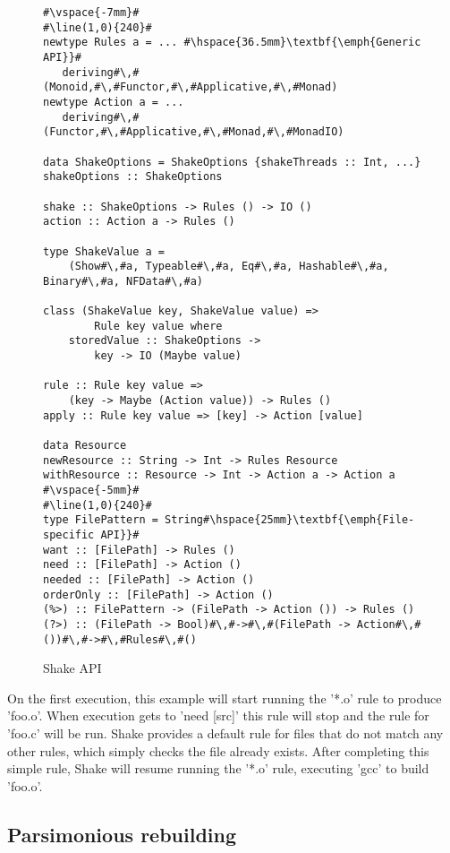 \begin{figure}
\begin{lstlisting}
#\vspace{-7mm}#
#\line(1,0){240}#
newtype Rules a = ... #\hspace{36.5mm}\textbf{\emph{Generic API}}#
   deriving#\,#(Monoid,#\,#Functor,#\,#Applicative,#\,#Monad)
newtype Action a = ...
   deriving#\,#(Functor,#\,#Applicative,#\,#Monad,#\,#MonadIO)

data ShakeOptions = ShakeOptions {shakeThreads :: Int, ...}
shakeOptions :: ShakeOptions

shake :: ShakeOptions -> Rules () -> IO ()
action :: Action a -> Rules ()

type ShakeValue a =
    (Show#\,#a, Typeable#\,#a, Eq#\,#a, Hashable#\,#a, Binary#\,#a, NFData#\,#a)

class (ShakeValue key, ShakeValue value) =>
        Rule key value where
    storedValue :: ShakeOptions ->
        key -> IO (Maybe value)

rule :: Rule key value =>
    (key -> Maybe (Action value)) -> Rules ()
apply :: Rule key value => [key] -> Action [value]

data Resource
newResource :: String -> Int -> Rules Resource
withResource :: Resource -> Int -> Action a -> Action a
#\vspace{-5mm}#
#\line(1,0){240}#
type FilePattern = String#\hspace{25mm}\textbf{\emph{File-specific API}}#
want :: [FilePath] -> Rules ()
need :: [FilePath] -> Action ()
needed :: [FilePath] -> Action ()
orderOnly :: [FilePath] -> Action ()
(%>) :: FilePattern -> (FilePath -> Action ()) -> Rules ()
(?>) :: (FilePath -> Bool)#\,#->#\,#(FilePath -> Action#\,#())#\,#->#\,#Rules#\,#()
\end{lstlisting}

\caption{Shake API\label{fig:shake-api}}
\end{figure}

On the first execution, this example will start running the \lst'*.o' rule to
produce \lst'foo.o'. When execution gets to \lst'need [src]' this rule will stop
and the rule for \lst'foo.c' will be run. Shake provides a default rule for
files that do not match any other rules, which simply checks the file already
exists. After completing this simple rule, Shake will resume running the
\lst'*.o' rule, executing \lst'gcc' to build \lst'foo.o'.

\subsection{Parsimonious rebuilding}

